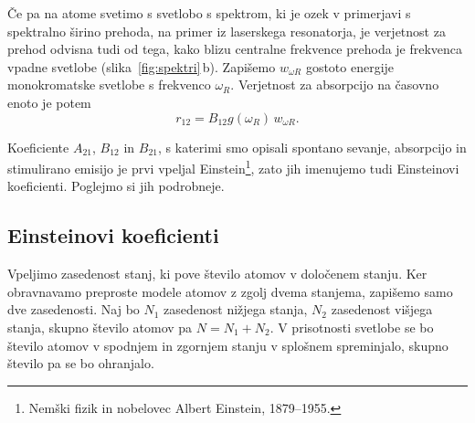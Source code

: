 Če pa na atome svetimo s svetlobo s spektrom, ki je ozek v primerjavi s spektralno 
širino prehoda, na primer iz laserskega resonatorja, je verjetnost za prehod 
odvisna tudi od tega, kako blizu centralne frekvence prehoda je frekvenca vpadne 
svetlobe (slika~\ref{fig:spektri}\,b). Zapišemo $w_{\omega R}$ gostoto energije 
monokromatske svetlobe s frekvenco $\omega_R$. Verjetnost za absorpcijo na časovno 
enoto je potem  
\begin{equation}
r_{12}=B_{12}g(\omega_R)\, w_{\omega R}.
\label{4.18}
\end{equation}

Koeficiente $A_{21}$, $B_{12}$ in $B_{21}$, s katerimi smo opisali spontano sevanje,
absorpcijo in stimulirano emisijo je prvi vpeljal Einstein\footnote{Nemški fizik
in nobelovec Albert Einstein, 1879--1955.}, zato jih imenujemo 
tudi Einsteinovi koeficienti. Poglejmo si jih podrobneje.

\subsection*{Einsteinovi koeficienti}
\label{AB}
Vpeljimo zasedenost stanj, ki pove število 
atomov v določenem stanju. Ker obravnavamo preproste modele atomov z zgolj 
dvema stanjema, zapišemo samo dve zasedenosti. Naj bo $N_1$ zasedenost 
nižjega stanja, $N_{2}$ zasedenost višjega stanja, skupno število atomov pa
$N=N_1+N_2$. V prisotnosti svetlobe 
se bo število atomov v spodnjem in zgornjem stanju v splošnem spreminjalo, skupno 
število pa se bo ohranjalo.

